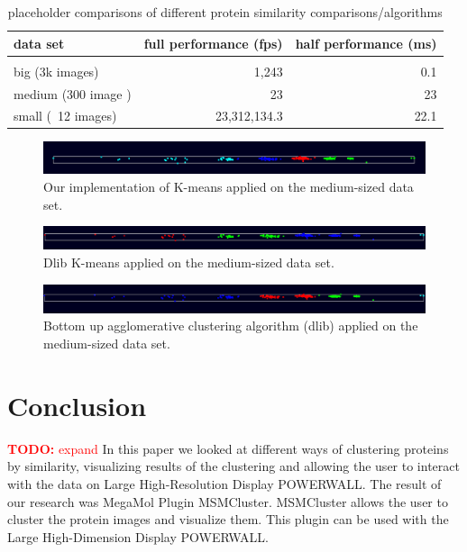 \documentclass[journal]{vgtc}       %
\newcommand{\todo}[1]{\textcolor{red}{\textbf{TODO:} #1}}
\begin{document}
\begin{table}[!h]
  \caption{
  \label{tab:perf} placeholder comparisons of different protein similarity comparisons/algorithms}
  \centering
  \vspace{0.3em}
  \begin{tabular}{lrr}
  data set & full performance (fps) & half performance (ms)\\ \hline\\[-0.4em]
  big (3k images) & 1,243 & 0.1 \\
  medium (300 image ) & 23 & 23 \\
  small (~12 images) & 23,312,134.3 & 22.1 \\
  \end{tabular}
  \end{table}

\begin{figure}[h!]
	\begin{center}
		\includegraphics[width=.75\linewidth]{k-Means-mediumDataSet.png}
	\end{center}
	\caption{\label{fig:kmeans} Our implementation of K-means applied on the medium-sized data set.}
\end{figure} 
\begin{figure}[h!]
	\begin{center}
		\includegraphics[width=.75\linewidth]{k-Means-dlib-mediumDataSet.png}
	\end{center}
	\caption{\label{fig:kmeans-dlib} Dlib K-means applied on the medium-sized data set.}
\end{figure}
\begin{figure}[h!]
	\begin{center}
		\includegraphics[width=.75\linewidth]{bottomUpAgglomerative-mediumDataSet.png}
	\end{center}
	\caption{\label{fig:bottomUpAgglomerative} Bottom up agglomerative clustering algorithm (dlib) applied on the medium-sized data set.}
\end{figure}


\section{Conclusion}
\todo{expand}
In this paper we looked at different ways of clustering proteins by similarity, visualizing results of the clustering and allowing the user to interact with the data on Large High-Resolution Display POWERWALL. The result of our research was MegaMol Plugin MSMCluster. MSMCluster allows the user to cluster the protein images and visualize them. This plugin can be used with the Large High-Dimension Display POWERWALL. 
\end{document}
